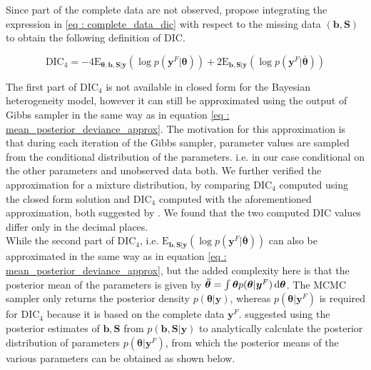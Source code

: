 Since part of the complete data are not observed, \citet{celeux_deviance_2006} propose integrating the expression in \ref{eq : complete_data_dic} with respect to the missing data $(\boldsymbol{b}, \boldsymbol{S})$ to obtain the following definition of DIC.

\begin{equation}
\label{eq : DIC4}
\text{DIC}_4 = -4\text{E}_{\boldsymbol{\theta}, \boldsymbol{b}, \boldsymbol{S}|\boldsymbol{y}}(\log{p(\boldsymbol{y}^F|\boldsymbol{\theta})}) + 
2\text{E}_{\boldsymbol{b}, \boldsymbol{S}|\boldsymbol{y}}(\log{p(\boldsymbol{y}^F|\boldsymbol{\bar{\theta}})})
\end{equation}

The first part of $\text{DIC}_4$ is not available in closed form for the Bayesian heterogeneity model, however it can still be approximated using the output of Gibbs sampler in the same way as in equation \ref{eq : mean_posterior_deviance_approx}. The motivation for this approximation is that during each iteration of the Gibbs sampler, parameter values are sampled from the conditional distribution of the parameters. i.e. in our case conditional on the other parameters and unobserved data both. We further verified the approximation for a mixture distribution, by comparing $\text{DIC}_4$ computed using the closed form solution and $\text{DIC}_4$ computed with the aforementioned approximation, both suggested by \citet{celeux_deviance_2006}. We found that the two computed DIC values differ only in the decimal places.\\

While the second part of $\text{DIC}_4$, i.e. $\text{E}_{\boldsymbol{b}, \boldsymbol{S}|\boldsymbol{y}}(\log{p(\boldsymbol{y}^F|\boldsymbol{\bar{\theta}})})$ can also be approximated in the same way as in equation \ref{eq : mean_posterior_deviance_approx}, but the added complexity here is that the posterior mean of the parameters is given by $\boldsymbol{\bar{\theta}} = \int \boldsymbol{\theta} p(\boldsymbol{\theta}|\boldsymbol{y}^F) \mathop{}\!\mathrm{d}\boldsymbol{\theta}$. The MCMC sampler only returns the posterior density $p(\boldsymbol{\theta}|\boldsymbol{y})$, whereas $p(\boldsymbol{\theta}|\boldsymbol{y}^F)$ is required for $\text{DIC}_4$ because it is based on the complete data $\boldsymbol{y}^F$. \citet{celeux_deviance_2006} suggested using the posterior estimates of $\boldsymbol{b}, \boldsymbol{S}$ from $p(\boldsymbol{b}, \boldsymbol{S}|\boldsymbol{y})$ to analytically calculate the posterior distribution of parameters $p(\boldsymbol{\theta}|\boldsymbol{y}^F)$, from which the posterior means of the various parameters can be obtained as shown below.

